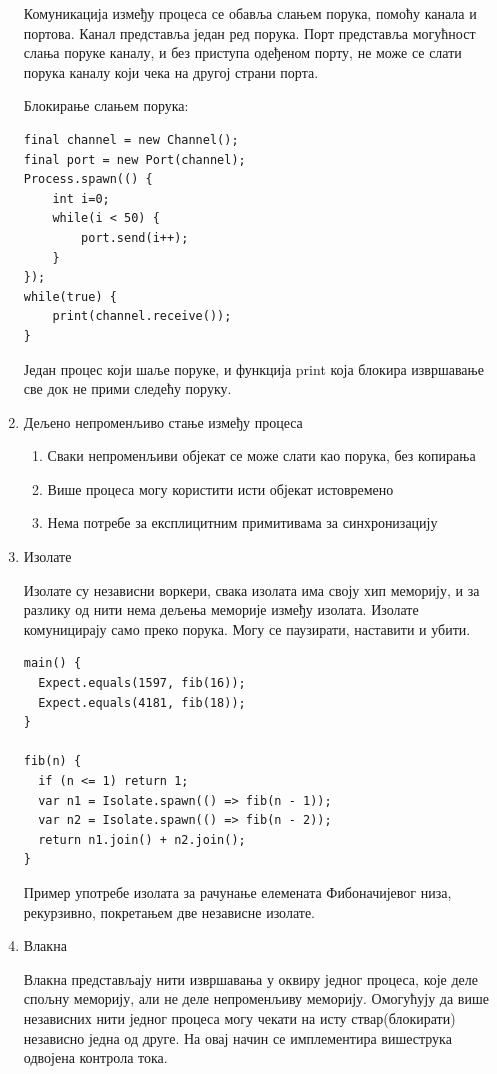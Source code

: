 \documentclass[12pt,oneside]{memoir}
\begin{document}
\begin{enumerate}
Комуникација између процеса се обавља слањем порука, помоћу канала и портова. Канал представља један ред порука. Порт представља могућност слања поруке каналу, и без приступа одеђеном порту, не може се слати порука каналу који чека на другој страни порта.

Блокирање слањем порука:

\begin{verbatim}
final channel = new Channel();
final port = new Port(channel);
Process.spawn(() {
	int i=0;
	while(i < 50) {
		port.send(i++);
	}
});
while(true) {
	print(channel.receive());
}
\end{verbatim}
Један процес који шаље поруке, и функција print која блокира извршавање све док не прими следећу поруку.

\item Дељено непроменљиво стање између процеса
\begin{enumerate}
\item Сваки непроменљиви објекат се може слати као порука, без копирања
\item Више процеса могу користити исти објекат истовремено
\item Нема потребе за експлицитним примитивама за синхронизацију
\end{enumerate}

\item Изолате

Изолате су независни воркери, свака изолата има своју хип меморију, и за разлику од нити нема дељења меморије између изолата. Изолате комуницирају само преко порука. Могу се паузирати, наставити и убити.

\begin{verbatim}
main() {
  Expect.equals(1597, fib(16));
  Expect.equals(4181, fib(18)); 
}

fib(n) {
  if (n <= 1) return 1;
  var n1 = Isolate.spawn(() => fib(n - 1));
  var n2 = Isolate.spawn(() => fib(n - 2));
  return n1.join() + n2.join();
}
\end{verbatim}
Пример употребе изолата за рачунање елемената Фибоначијевог низа, рекурзивно, покретањем две независне изолате.

\item Влакна

Влакна представљају нити извршавања у оквиру једног процеса, које деле спољну меморију, али не деле непроменљиву меморију. Омогућују да више независних нити једног процеса могу чекати на исту ствар(блокирати) независно једна од друге. На овај начин се имплементира вишеструка одвојена контрола тока.


\end{enumerate}
\end{document}
